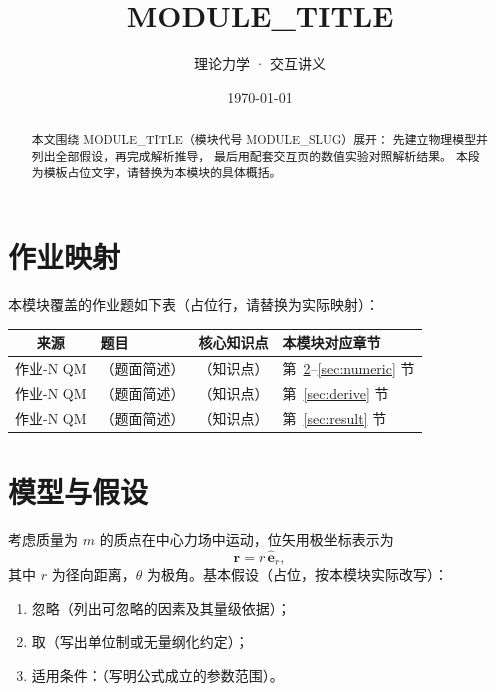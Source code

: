 \documentclass[UTF8,a4paper,11pt]{ctexart}
\title{\textbf{{{MODULE_TITLE}}}}
\author{理论力学 · 交互讲义}
\date{\today}
\begin{document}
\maketitle

\begin{abstract}
本文围绕 {{MODULE_TITLE}}（模块代号 {{MODULE_SLUG}}）展开：
先建立物理模型并列出全部假设，再完成解析推导，
最后用配套交互页的数值实验对照解析结果。
本段为模板占位文字，请替换为本模块的具体概括。
\end{abstract}

\tableofcontents
\newpage

\section{作业映射}
本模块覆盖的作业题如下表（占位行，请替换为实际映射）：

\begin{center}
\begin{tabular}{clll}
\toprule
来源 & 题目 & 核心知识点 & 本模块对应章节 \\
\midrule
作业-N QM & （题面简述） & （知识点） & 第~\ref{sec:model}--\ref{sec:numeric} 节 \\
作业-N QM & （题面简述） & （知识点） & 第~\ref{sec:derive} 节 \\
作业-N QM & （题面简述） & （知识点） & 第~\ref{sec:result} 节 \\
\bottomrule
\end{tabular}
\end{center}

\section{模型与假设}\label{sec:model}
考虑质量为 $m$ 的质点在中心力场中运动，位矢用极坐标表示为
\begin{equation}
  \mathbf r = r\,\hat{\mathbf e}_r,
  \label{eq:tpl-r}
\end{equation}
其中 $r$ 为径向距离，$\theta$ 为极角。基本假设（占位，按本模块实际改写）：
\begin{enumerate}
  \item 忽略（列出可忽略的因素及其量级依据）；
  \item 取（写出单位制或无量纲化约定）；
  \item 适用条件：（写明公式成立的参数范围）。
\end{enumerate}
\end{document}
